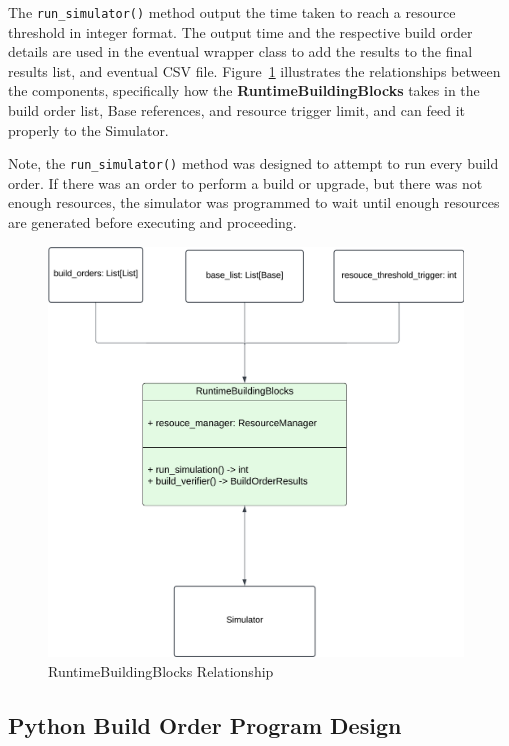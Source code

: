 \documentclass[a4paper, 12pt, english]{article}
\begin{document}
The \texttt{run\_simulator()} method output the time taken to reach a resource threshold in integer format. The output time and the respective build order details are used in the eventual wrapper class to add the results to the final results list, and eventual CSV file. Figure~\ref{fig:RuntimeBlocks} illustrates the relationships between the components, specifically how the \textbf{RuntimeBuildingBlocks} takes in the build order list, Base references, and resource trigger limit, and can feed it properly to the Simulator.
\newline

Note, the \texttt{run\_simulator()} method was designed to attempt to run every build order. If there was an order to perform a build or upgrade, but there was not enough resources, the simulator was programmed to wait until enough resources are generated before executing and proceeding.

\begin{figure}[!ht]
    \begin{center}
        \includegraphics[width=110mm,scale=1.0]{HaloWarsDiagramRuntimeBuildingBlocks.png}
    \end{center}
    \caption{\label{fig:RuntimeBlocks}RuntimeBuildingBlocks Relationship}
\end{figure}




\newpage
\subsection{Python Build Order Program Design}
\end{document}
